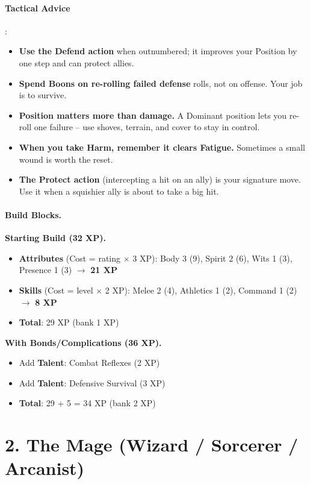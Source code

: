 \paragraph{Tactical Advice}:
\begin{itemize}
\item \textbf{Use the Defend action} when outnumbered; it improves your Position by one step and can protect allies.
\item \textbf{Spend Boons on re-rolling failed defense} rolls, not on offense. Your job is to survive.
\item \textbf{Position matters more than damage.} A Dominant position lets you re-roll one failure -- use shoves, terrain, and cover to stay in control.
\item \textbf{When you take Harm, remember it clears Fatigue.} Sometimes a small wound is worth the reset.
\item \textbf{The Protect action} (intercepting a hit on an ally) is your signature move. Use it when a squishier ally is about to take a big hit.
\end{itemize}

\paragraph{Build Blocks.}
\textbf{Starting Build (32 XP).}
\begin{itemize}
\item \textbf{Attributes} (Cost = rating \(\times\) 3 XP): Body 3 (9), Spirit 2 (6), Wits 1 (3), Presence 1 (3) \(\rightarrow\) \textbf{21 XP}
\item \textbf{Skills} (Cost = level \(\times\) 2 XP): Melee 2 (4), Athletics 1 (2), Command 1 (2) \(\rightarrow\) \textbf{8 XP}
\item \textbf{Total}: 29 XP (bank 1 XP)
\end{itemize}
\textbf{With Bonds/Complications (36 XP).}
\begin{itemize}
\item Add \textbf{Talent}: Combat Reflexes (2 XP)
\item Add \textbf{Talent}: Defensive Survival (3 XP)
\item \textbf{Total}: 29 + 5 = 34 XP (bank 2 XP)
\end{itemize}

\section{2. The Mage (Wizard / Sorcerer / Arcanist)}
\label{sec:concept-mage}

